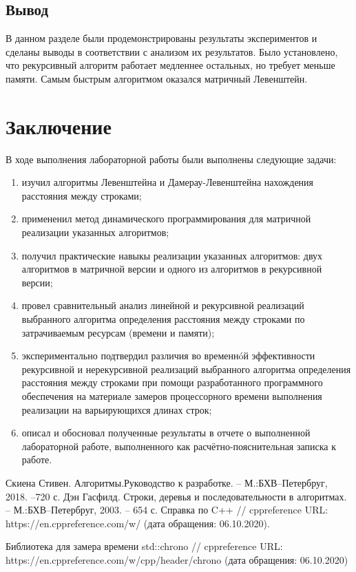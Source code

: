 \documentclass[12pt,a4paper,oneside]{report}
\begin{document}
\section*{Вывод} 
\qquad В данном разделе были продемонстрированы результаты экспериментов и сделаны выводы в соответствии с анализом их результатов. Было установлено, что рекурсивный алгоритм работает медленнее остальных, но требует меньше памяти. Самым быстрым алгоритмом оказался матричный Левенштейн.
\chapter*{Заключение}
\qquad В ходе выполнения лабораторной работы были выполнены следующие задачи:
\begin{enumerate}
	\item изучил алгоритмы Левенштейна и Дамерау-Левенштейна нахождения расстояния между строками;
	\item примененил метод динамического программирования для матричной реализации указанных алгоритмов; 
	\item получил практические навыкы реализации указанных алгоритмов: двух алгоритмов в матричной версии и одного из алгоритмов в рекурсивной версии; 
	\item провел сравнительный анализ линейной и рекурсивной реализаций выбранного алгоритма определения расстояния между строками по затрачиваемым ресурсам (времени и памяти); 
	\item экспериментально подтвердил различия во временнóй эффективности рекурсивной и
	нерекурсивной реализаций выбранного алгоритма определения расстояния между строками при
	помощи разработанного программного обеспечения на материале замеров процессорного времени
	выполнения реализации на варьирующихся длинах строк; 
	\item описал и обосновал полученные результаты в отчете о выполненной лабораторной
	работе, выполненного как расчётно-пояснительная записка к работе. 
\end{enumerate}




\newpage


   	\renewcommand{\bibname}{Список использованной литературы}
\begin{thebibliography}{3}
	
	Скиена Стивен. Алгоритмы.Руководство к разработке. -- М.:БХВ--Петербруг, 2018. --720 с.
	Дэн Гасфилд. Строки, деревья и последовательности в алгоритмах. -- М.:БХВ--Петербруг, 2003. -- 654 с.
			Справка по C++ // cppreference URL: https://en.cppreference.com/w/ (дата обращения: 06.10.2020).
	
	 Библиотека для замера времени std::chrono // cppreference URL: https://en.cppreference.com/w/cpp/header/chrono (дата обращения: 06.10.2020)

\end{thebibliography}
\end{document}
